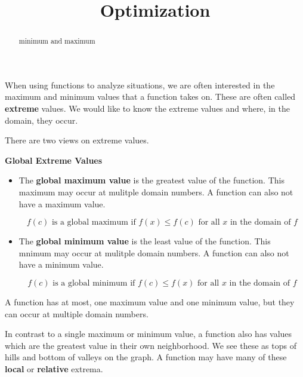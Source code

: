 \documentclass{ximera}
\title{Optimization}
\begin{document}
\begin{abstract}
minimum and maximum
\end{abstract}
\maketitle



When using functions to analyze situations, we are often interested in the maximum and minimum values that a function takes on. These are often called \textbf{extreme} values. We would like to know the extreme values and where, in the domain, they occur.



There are two views on extreme values.

\textbf{Global Extreme Values} 

\begin{itemize}
\item The \textbf{global maximum value} is the greatest value of the function.  This maximum may occur at mulitple domain numbers.  A function can also not have a maximum value.

\[  f(c) \text{ is a global maximum if } f(x) \leq f(c) \text{ for all } x \text{ in the domain of } f \]

\item The \textbf{global minimum value} is the least value of the function.  This mnimum may occur at mulitple domain numbers.  A function can also not have a minimum value.

\[  f(c) \text{ is a global minimum if } f(c) \leq f(x) \text{ for all } x \text{ in the domain of } f \]
\end{itemize}

A function has at most, one maximum value and one minimum value, but they can occur at multiple domain numbers.

In contrast to a single maximum or minimum value, a function also has values which are the greatest value in their own neighborhood.  We see these as tops of hills and bottom of valleys on the graph.  A function may have many of these \textbf{local} or \textbf{relative} extrema.
\end{document}
